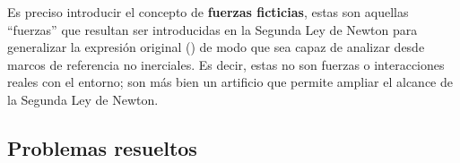 \documentclass[/home/hernan/Documentos/Apuntes_mecanica_teorica/main.tex]{subfiles}
\begin{document}
	Es preciso introducir el concepto de \textbf{fuerzas ficticias}, estas son aquellas ``fuerzas'' que resultan ser introducidas en la Segunda Ley de Newton para generalizar la expresión original () de modo que sea capaz de analizar desde marcos de referencia no inerciales. Es decir, estas no son fuerzas o interacciones reales con el entorno; son más bien un artificio que permite ampliar el alcance de la Segunda Ley de Newton.

	\subsection{Problemas resueltos}
	
\end{document}

